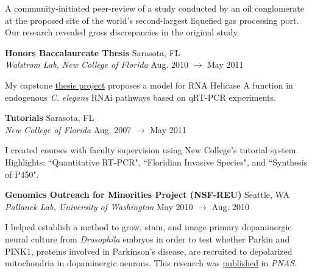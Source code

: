 \documentclass[a4paper,12pt]{article}
\newcommand{\ressubheading}[4]{{\begin{minipage}{\textwidth}
        \textbf{#1} \hfill #2 \\
        \textit{#3} \hfill #4 \\
        \end{minipage}}}
\begin{document}
\vspace{-6pt} A community-initiated peer-review of a study conducted by an oil conglomerate at the proposed site of the world's second-largest liquefied gas processing port. Our research revealed gross discrepancies in the original study.\\ %

    \ressubheading{Honors Baccalaureate Thesis}{Sarasota, FL}{Walstrom Lab, New College of Florida}{Aug. 2010 $\rightarrow$ May 2011}

\vspace{-6pt} My capstone \hyperlink{thesispub}{thesis project} proposes a model for RNA Helicase A function in endogenous \emph{C. elegans} RNAi pathways based on qRT-PCR experiments.\\ %

    \ressubheading{Tutorials}{Sarasota, FL}{New College of Florida}{Aug. 2007 $\rightarrow$ May 2011}
    
\vspace{-6pt} I created courses with faculty supervision using New College's tutorial system. Highlights: ``Quantitative RT-PCR", ``Floridian Invasive Species", and ``Synthesis of P450".\\

    \ressubheading{Genomics Outreach for Minorities Project (NSF-REU)}{Seattle, WA}{Pallanck Lab, University of Washington}{May 2010 $\rightarrow$ Aug. 2010}
    
\vspace{-6pt} I helped establish a method to grow, stain, and image primary dopaminergic neural culture from \textit{Drosophila} embryos in order to test whether Parkin and PINK1, proteins involved in Parkinson's disease, are recruited to depolarized mitochondria in dopaminergic neurons. This research was \hyperlink{neuronpub}{published} in \textit{PNAS}.\\

\end{document}
